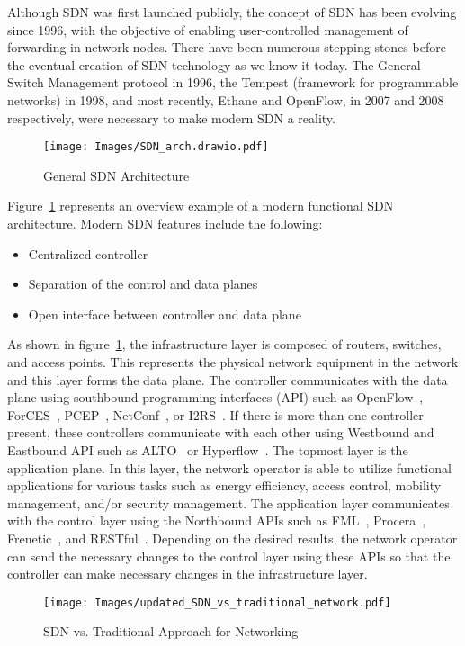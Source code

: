 \documentclass[conference]{IEEEtran}
\begin{document}
Although SDN was first launched publicly, the concept of SDN has been evolving since 1996, with the objective of enabling user-controlled management of forwarding in network nodes\cite{zhang2022performance}. There have been numerous stepping stones before the eventual creation of SDN technology as we know it today. The General Switch Management protocol in 1996, the Tempest (framework for programmable networks) in 1998, and  most recently,  Ethane and OpenFlow, in 2007 and 2008 respectively, were necessary to make modern SDN a reality. 
\begin{figure}[h]
\centering
\texttt{[image: Images/SDN\_arch.drawio.pdf]}
\caption{General SDN Architecture}
\label{fig:SDN_arch}
\end{figure}
 Figure~\ref{fig:SDN_arch} represents an overview example of a modern functional SDN architecture. Modern SDN features include the following: 
 \begin{itemize}
     \item Centralized controller
     \item Separation of the control and data planes
     \item Open interface between controller and data plane
 \end{itemize}
 As shown in figure~\ref{fig:SDN_arch}, the infrastructure layer is composed of routers, switches, and access points. This represents the physical network equipment in the network and this layer forms the data plane. The controller communicates with the data plane using southbound  programming interfaces (API) such as OpenFlow~\cite{kreutz2014software}, ForCES~\cite{haleplidis2015network}, PCEP~\cite{vasseur2009path}, NetConf~\cite{enns2006netconf}, or I2RS~\cite{hares2013software}. If there is more than one controller present, these controllers communicate with each other using Westbound and Eastbound API such as ALTO~\cite{zhou2014rest} or Hyperflow~\cite{tootoonchian2010hyperflow}. The topmost layer is the application plane. In this layer, the network operator is able to utilize functional applications for various tasks such as energy efficiency, access control, mobility management, and/or security management. The application layer communicates with the control layer using the Northbound APIs such as FML~\cite{hinrichs2009practical}, Procera~\cite{voellmy2012procera}, Frenetic~\cite{foster2011frenetic}, and RESTful~\cite{zhou2014rest}. Depending on the desired results, the network operator can send the necessary changes to the control layer using these APIs so that the controller can make necessary changes in the infrastructure layer. 
 \begin{figure}[h]
\centering
\texttt{[image: Images/updated\_SDN\_vs\_traditional\_network.pdf]}
\caption{SDN vs. Traditional Approach for Networking }
\label{fig:New_vs_Old_SDN}
\end{figure}
\end{document}
